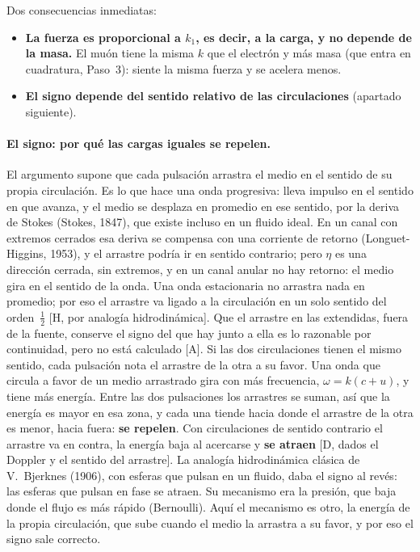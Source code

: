 \documentclass[11pt,a4paper]{article}
\newcommand{\st}[1]{\textup{[#1]}}
\newcommand{\apartado}[1]{\paragraph{#1}}
\begin{document}
Dos consecuencias inmediatas:
\begin{itemize}[leftmargin=*]
\item \textbf{La fuerza es proporcional a $k_1$, es decir, a la carga, y no depende de la masa.} El muón tiene la misma $k$ que el electrón y más masa (que entra en cuadratura, Paso~3): siente la misma fuerza y se acelera menos.
\item \textbf{El signo depende del sentido relativo de las circulaciones} (apartado siguiente).
\end{itemize}

\apartado{El signo: por qué las cargas iguales se repelen.} El argumento supone que cada pulsación arrastra el medio en el sentido de su propia circulación. Es lo que hace una onda progresiva: lleva impulso en el sentido en que avanza, y el medio se desplaza en promedio en ese sentido, por la deriva de Stokes (Stokes, 1847), que existe incluso en un fluido ideal. En un canal con extremos cerrados esa deriva se compensa con una corriente de retorno (Longuet-Higgins, 1953), y el arrastre podría ir en sentido contrario; pero $\eta$ es una dirección cerrada, sin extremos, y en un canal anular no hay retorno: el medio gira en el sentido de la onda. Una onda estacionaria no arrastra nada en promedio; por eso el arrastre va ligado a la circulación en un solo sentido del orden~$\tfrac12$ \st{H, por analogía hidrodinámica}. Que el arrastre en las extendidas, fuera de la fuente, conserve el signo del que hay junto a ella es lo razonable por continuidad, pero no está calculado \st{A}. Si las dos circulaciones tienen el mismo sentido, cada pulsación nota el arrastre de la otra a su favor. Una onda que circula a favor de un medio arrastrado gira con más frecuencia, $\omega=k(c+u)$, y tiene más energía. Entre las dos pulsaciones los arrastres se suman, así que la energía es mayor en esa zona, y cada una tiende hacia donde el arrastre de la otra es menor, hacia fuera: \textbf{se repelen}. Con circulaciones de sentido contrario el arrastre va en contra, la energía baja al acercarse y \textbf{se atraen} \st{D, dados el Doppler y el sentido del arrastre}. La analogía hidrodinámica clásica de V.~Bjerknes (1906), con esferas que pulsan en un fluido, daba el signo al revés: las esferas que pulsan en fase se atraen. Su mecanismo era la presión, que baja donde el flujo es más rápido (Bernoulli). Aquí el mecanismo es otro, la energía de la propia circulación, que sube cuando el medio la arrastra a su favor, y por eso el signo sale correcto.
\end{document}
